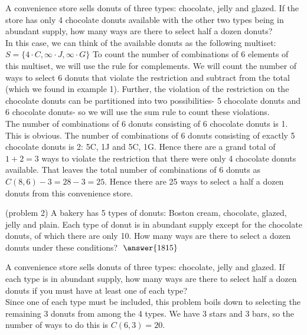 \documentclass[handout]{ximera}
\begin{document}
\begin{example}[example 2]
A convenience store sells donuts of three types: chocolate, jelly and glazed.  If the store has only 4 chocolate donuts available with the other two types being in abundant supply, how many ways are there to select half a dozen donuts?\\
In this case, we can think of the available donuts as the following multiset: 
$S = \{4\cdot C, \infty \cdot J, \infty \cdot G\}$ To count the number of combinations of 6 elements of this multiset, we will use the rule for complements. We will count the number of ways to select 6 donuts that violate the restriction and subtract from the total (which we found in example 1).  Further, the violation of the restriction on the chocolate donuts can be partitioned into two possibilities- 5 chocolate donuts and 6 chocolate donuts- so we will use the sum rule to count these violations.\\
The number of combinations of 6 donuts consisting of 6 chocolate donuts is 1. This is obvious.  The number of combinations of 6 donuts consisting of exactly 5 chocolate donuts is 2: 5C, 1J and 5C, 1G.  Hence there are a grand total of $1+2 =3$
ways to violate the restriction that there were only 4 chocolate donuts available.  That leaves the total number of combinations of 6 donuts as $C(8,6) -3 = 28 - 3 = 25$.
Hence there are 25 ways to select a half a dozen donuts from this convenience store.
\end{example}


\begin{problem}(problem 2)
A bakery has 5 types of donuts: Boston cream, chocolate, glazed, jelly and plain.
Each type of donut is in abundant supply except for the chocolate donuts, of which there are only 10. 
How many ways are there to select a dozen donuts under these conditions? $\; \answer{1815}$
\end{problem}


\begin{example}[example 3]
A convenience store sells donuts of three types: chocolate, jelly and glazed.  
If each type is in abundant supply, how many ways are there to select half a 
dozen donuts if you must have at least one of each type?\\
Since one of each type must be included, this problem boils down to selecting the 
remaining 3 donuts from among the 4 types. We have 3 stars and 3 bars, so
the number of ways to do this is $C(6, 3) = 20$.
\end{example}
\end{document}
